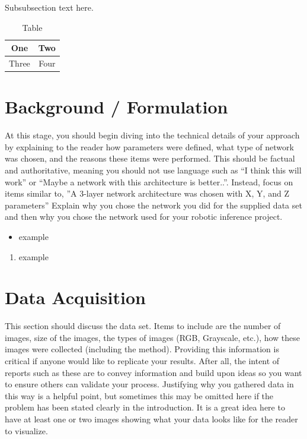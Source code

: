 \documentclass[10pt,journal,compsoc]{IEEEtran}
\begin{document}
\subsubsection{}
Subsubsection text here.


\begin{table}[h]
\caption{Table}
\label{table_example}
\begin{center}
\begin{tabular}{|c||c|}
\hline
One & Two\\
\hline
Three & Four\\
\hline
\end{tabular}
\end{center}
\end{table}



   

\section{Background / Formulation}
At this stage, you should begin diving into the technical details of your approach by explaining to the reader how parameters were defined, what type of network was chosen, and the reasons these items were performed. This should be factual and authoritative, meaning you should not use language such as “I think this will work” or “Maybe a network with this architecture is better..”. Instead, focus on items similar to, ”A 3-layer network architecture was chosen with X, Y, and Z parameters” 
Explain why you chose the network you did for the supplied data set and then why you chose the network used for your robotic inference project. \cite{lamport1994latex}


\begin{itemize}
\item example
\end {itemize}



\begin{enumerate}
\item example

\end{enumerate}

\section{Data Acquisition}
This section should discuss the data set. Items to include are the number of images, size of the images, the types of images (RGB, Grayscale, etc.), how these images were collected (including the method). Providing this information is critical if anyone would like to replicate your results. After all, the intent of reports such as these are to convey information and build upon ideas so you want to ensure others can validate your process.
Justifying why you gathered data in this way is a helpful point, but sometimes this may be omitted here if the problem has been stated clearly in the introduction.
It is a great idea here to have at least one or two images showing what your data looks like for the reader to visualize.
\end{document}
